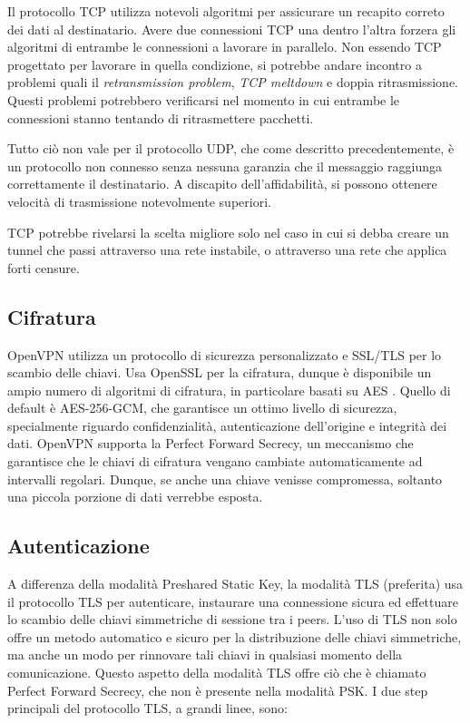 Il protocollo TCP utilizza notevoli algoritmi per assicurare un recapito correto dei dati al destinatario. Avere due connessioni TCP una dentro l'altra forzera gli algoritmi di entrambe le connessioni a lavorare in parallelo. Non essendo TCP progettato per lavorare in quella condizione, si potrebbe andare incontro a problemi quali il \emph{retransmission problem}, \emph{TCP meltdown} e doppia ritrasmissione. Questi problemi potrebbero verificarsi nel momento in cui entrambe le connessioni stanno tentando di ritrasmettere pacchetti.

Tutto ciò non vale per il protocollo UDP, che come descritto precedentemente, è un protocollo non connesso senza nessuna garanzia che il messaggio raggiunga correttamente il destinatario. A discapito dell'affidabilità, si possono ottenere velocità di trasmissione notevolmente superiori.

TCP potrebbe rivelarsi la scelta migliore solo nel caso in cui si debba creare un tunnel che passi attraverso una rete instabile, o attraverso una rete che applica forti censure.

\subsection{Cifratura}
OpenVPN utilizza un protocollo di sicurezza personalizzato e SSL/TLS per lo scambio delle chiavi. Usa OpenSSL per la cifratura, dunque è disponibile un ampio numero di algoritmi di cifratura, in particolare basati su AES \cite[RFC3826]{RFC3826}. Quello di default è AES-256-GCM, che garantisce un ottimo livello di sicurezza, specialmente riguardo confidenzialità, autenticazione dell'origine e integrità dei dati.
OpenVPN supporta la Perfect Forward Secrecy, un meccanismo che garantisce che le chiavi di cifratura vengano cambiate automaticamente ad intervalli regolari. Dunque, se anche una chiave venisse compromessa, soltanto una piccola porzione di dati verrebbe esposta.

\subsection{Autenticazione}
A differenza della modalità Preshared Static Key, la modalità TLS (preferita) usa il protocollo TLS per autenticare, instaurare una connessione sicura ed effettuare lo scambio delle chiavi simmetriche di sessione tra i peers. L'uso di TLS non solo offre un metodo automatico e sicuro per la distribuzione delle chiavi simmetriche, ma anche un modo per rinnovare tali chiavi in qualsiasi momento della comunicazione.
Questo aspetto della modalità TLS offre ciò che è chiamato Perfect Forward Secrecy, che non è presente nella modalità PSK.
I due step principali del protocollo TLS, a grandi linee, sono:

